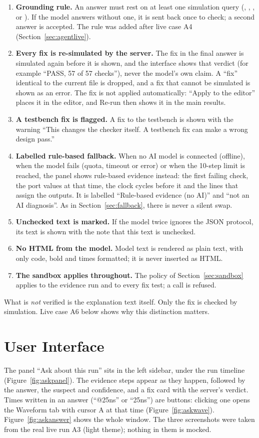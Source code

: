 \begin{enumerate}
\item \textbf{Grounding rule.} An answer must rest on at least one simulation query
(, , ,  or
). If the model answers without one, it is sent back once to check;
a second answer is accepted. The rule was added after live case A4
(Section~\ref{sec:agentlive}).
\item \textbf{Every fix is re-simulated by the server.} The fix in the final answer
is simulated again before it is shown, and the interface shows that verdict (for
example ``PASS, 57 of 57 checks''), never the model's own claim. A ``fix'' identical
to the current file is dropped, and a fix that cannot be simulated is shown as an
error. The fix is not applied automatically: ``Apply to the editor'' places it in the
editor, and Re-run then shows it in the main results.
\item \textbf{A testbench fix is flagged.} A fix to the testbench is shown with the
warning ``This changes the checker itself. A testbench fix can make a wrong design
pass.''
\item \textbf{Labelled rule-based fallback.} When no AI model is connected (offline),
when the model fails (quota, timeout or error) or when the 10-step limit is reached,
the panel shows rule-based evidence instead: the first failing check, the port values
at that time, the clock cycles before it and the lines that assign the outputs. It is
labelled ``Rule-based evidence (no AI)'' and ``not an AI diagnosis''. As in
Section~\ref{sec:fallback}, there is never a silent swap.
\item \textbf{Unchecked text is marked.} If the model twice ignores the JSON
protocol, its text is shown with the note that this text is unchecked.
\item \textbf{No HTML from the model.} Model text is rendered as plain text, with
only code, bold and times formatted; it is never inserted as HTML.
\item \textbf{The sandbox applies throughout.} The policy of
Section~\ref{sec:sandbox} applies to the evidence run and to every fix test; a
 call is refused.
\end{enumerate}

What is \emph{not} verified is the explanation text itself. Only the fix is checked
by simulation. Live case A6 below shows why this distinction matters.

\section{User Interface}
\label{sec:agentui}
The panel ``Ask about this run'' sits in the left sidebar, under the run timeline
(Figure~\ref{fig:askpanel}). The evidence steps appear as they happen, followed by
the answer, the suspect and confidence, and a fix card with the server's verdict.
Times written in an answer (``@25ns'' or ``25ns'') are buttons: clicking one opens
the Waveform tab with cursor A at that time (Figure~\ref{fig:askwave}).
Figure~\ref{fig:askanswer} shows the whole window. The three screenshots were taken
from the real live run A3 (light theme); nothing in them is mocked.

